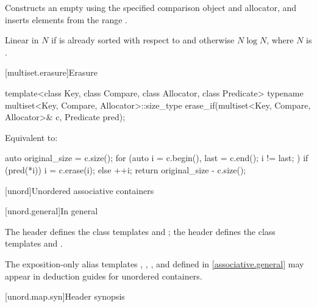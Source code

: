 \begin{itemdescr}
\pnum
\effects
Constructs an empty 
using the specified comparison object and allocator, and
inserts elements from the range .

\pnum
\complexity
Linear in $N$ if  is already sorted with respect to  and
otherwise $N \log N$, where $N$ is .
\end{itemdescr}

[multiset.erasure]{Erasure}

%
\begin{itemdecl}
template<class Key, class Compare, class Allocator, class Predicate>
  typename multiset<Key, Compare, Allocator>::size_type
    erase_if(multiset<Key, Compare, Allocator>& c, Predicate pred);
\end{itemdecl}

\begin{itemdescr}
\pnum
\effects
Equivalent to:
\begin{codeblock}
auto original_size = c.size();
for (auto i = c.begin(), last = c.end(); i != last; ) {
  if (pred(*i)) {
    i = c.erase(i);
  } else {
    ++i;
  }
}
return original_size - c.size();
\end{codeblock}
\end{itemdescr}

[unord]{Unordered associative containers}

[unord.general]{In general}

\pnum
The header  defines the class templates
 and
; the header  defines the class templates
 and .

\pnum
The exposition-only alias templates
, ,
, and 
defined in \ref{associative.general} may appear in deduction guides for unordered containers.

[unord.map.syn]{Header  synopsis}

